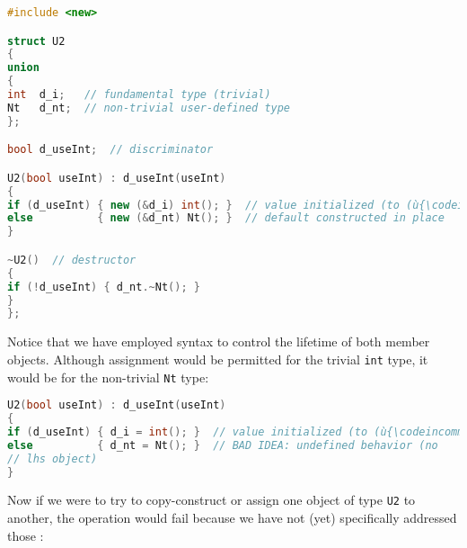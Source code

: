 %
%
%
\begin{lstlisting}[language=C++]
#include <new>

struct U2
{
union
{
int  d_i;   // fundamental type (trivial)
Nt   d_nt;  // non-trivial user-defined type
};

bool d_useInt;  // discriminator

U2(bool useInt) : d_useInt(useInt)
{
if (d_useInt) { new (&d_i) int(); }  // value initialized (to (ù{\codeincomments{0}}ù))
else          { new (&d_nt) Nt(); }  // default constructed in place
}

~U2()  // destructor
{
if (!d_useInt) { d_nt.~Nt(); }
}
};
\end{lstlisting}


\noindent Notice that we have employed  syntax to
control the lifetime of both member objects. Although assignment would
be permitted for the trivial \lstinline!int! type, it would be
 for the non-trivial \lstinline!Nt! type:

\begin{lstlisting}[language=C++]
U2(bool useInt) : d_useInt(useInt)
{
if (d_useInt) { d_i = int(); }  // value initialized (to (ù{\codeincomments{0}}ù))
else          { d_nt = Nt(); }  // BAD IDEA: undefined behavior (no
// lhs object)
}
\end{lstlisting}


\noindent Now if we were to try to copy-construct or assign one object of type
\lstinline!U2! to another, the operation would fail because we have not
(yet) specifically addressed those :

